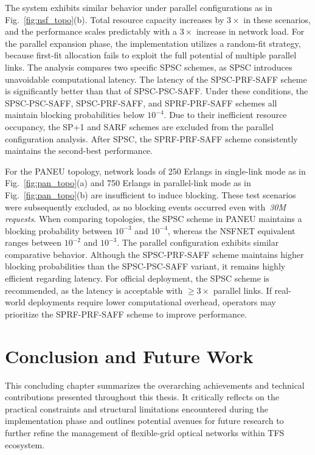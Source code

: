 \documentclass[12pt, a4paper, twoside, openright]{report}
\begin{document}
The system exhibits similar behavior under parallel configurations as in Fig.~\ref{fig:nsf_topo}(b). Total resource capacity increases by $3\times$ in these scenarios, and the performance scales predictably with a $3\times$ increase in network load. For the parallel expansion phase, the implementation utilizes a random-fit strategy, because first-fit allocation fails to exploit the full potential of multiple parallel links. The analysis compares two specific SPSC schemes, as SPSC introduces unavoidable computational latency. The latency of the SPSC-PRF-SAFF scheme is significantly better than that of SPSC-PSC-SAFF. Under these conditions, the SPSC-PSC-SAFF, SPSC-PRF-SAFF, and SPRF-PRF-SAFF schemes all maintain blocking probabilities below $10^{-4}$. Due to their inefficient resource occupancy, the SP+1 and SARF schemes are excluded from the parallel configuration analysis. After SPSC, the SPRF-PRF-SAFF scheme consistently maintains the second-best performance.

For the PANEU topology, network loads of 250 Erlangs in single-link mode as in Fig.~\ref{fig:pan_topo}(a) and 750 Erlangs in parallel-link mode as in Fig.~\ref{fig:pan_topo}(b) are insufficient to induce blocking. These test scenarios were subsequently excluded, as no blocking events occurred even with~\emph{30M requests}. When comparing topologies, the SPSC scheme in PANEU maintains a blocking probability between $10^{-3}$ and $10^{-4}$, whereas the NSFNET equivalent ranges between $10^{-2}$ and $10^{-3}$. The parallel configuration exhibits similar comparative behavior. Although the SPSC-PRF-SAFF scheme maintains higher blocking probabilities than the SPSC-PSC-SAFF variant, it remains highly efficient regarding latency. For official deployment, the SPSC scheme is recommended, as the latency is acceptable with $\geq 3\times$ parallel links. If real-world deployments require lower computational overhead, operators may prioritize the SPRF-PRF-SAFF scheme to improve performance.

\chapter{Conclusion and Future Work}
This concluding chapter summarizes the overarching achievements and technical contributions presented throughout this thesis. It critically reflects on the practical constraints and structural limitations encountered during the implementation phase and outlines potential avenues for future research to further refine the management of flexible-grid optical networks within TFS ecosystem.
\end{document}
